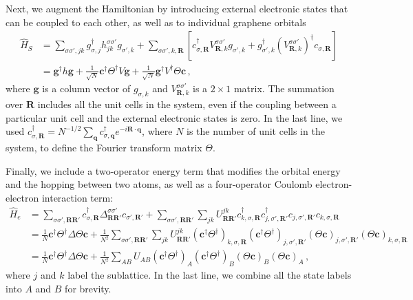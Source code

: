 \documentclass[aps, prb, superscriptaddress, preprint, floatfix]{revtex4-1}
\begin{document}
Next, we augment the Hamiltonian by introducing external electronic states that can be coupled to each other, as well as to individual graphene orbitals
%
\begin{align}
	\hat{H}_S 
	&=
	\sum_{\sigma\sigma', jk} g_{\sigma, j}^\dagger h^{\sigma\sigma'}_{jk} g_{ \sigma',k} + 
	\sum_{\sigma\sigma',k,\mathbf{R}}\left[c^\dagger_{\sigma,\mathbf{R}} V^{\sigma\sigma'}_{\mathbf{R},k}g_{\sigma',k} + g_{\sigma',k}^\dagger \left(V^{\sigma\sigma'}_{\mathbf{R},k}\right)^\dagger c_{\sigma,\mathbf{R}}\right]
	\nonumber
	\\
	&=
	\mathbf{g}^\dagger h\mathbf{g}
	 + 
	 \frac{1}{\sqrt{N}}\mathbf{c}^\dagger \Theta^\dagger V\mathbf{g} 
	 + 
	 \frac{1}{\sqrt{N}}\mathbf{g}^\dagger V^\dagger \Theta \mathbf{c}
	\,,
\end{align}
%
where $\mathbf{g}$ is a column vector of $g_{\sigma,k}$ and $V^{\sigma\sigma'}_{\mathbf{R},k}$ is a $2\times 1$ matrix. The summation over $\mathbf{R}$ includes all the unit cells in the system, even if the coupling between a particular unit cell and the external electronic states is zero. In the last line, we used $c^\dagger_{\sigma,\mathbf{R}} = N^{-1/2}\sum_\mathbf{q}c^\dagger_{\sigma,\mathbf{q}} e^{-i\mathbf{R}\cdot\mathbf{q}}$, where $N$ is the number of unit cells in the system, to define the Fourier transform matrix $\Theta$.

Finally, we include a two-operator energy term that modifies the orbital energy and the hopping between two atoms, as well as a four-operator Coulomb electron-electron interaction term:
%
\begin{align}
	\hat{H}_{e} &= 
	\sum_{\sigma\sigma',\mathbf{RR}'} c^\dagger_{\sigma,\mathbf{R}}\Delta_{\mathbf{RR}'}^{\sigma\sigma'}c_{\sigma',\mathbf{R}'}
	+
	\sum_{\sigma\sigma',\mathbf{RR}'}\sum_{jk}
	U_{\mathbf{RR}'}^{jk}
	c_{k,\sigma,\mathbf{R}}^\dagger
	c_{j,\sigma',\mathbf{R}'}^\dagger
	c_{j,\sigma',\mathbf{R}'}
	c_{k,\sigma,\mathbf{R}}
	\nonumber
	\\
	&= 
	\frac{1}{N}\mathbf{c}^\dagger \Theta^\dagger \Delta\Theta\mathbf{c}
	+
	\frac{1}{N^2}\sum_{\sigma\sigma',\mathbf{RR}'}\sum_{jk}
	U_{\mathbf{RR}'}^{jk}
	\left(\mathbf{c}^\dagger\Theta^\dagger \right)_{k,\sigma,\mathbf{R}}
	\left(\mathbf{c}^\dagger\Theta^\dagger \right)_{j,\sigma',\mathbf{R}'}
	\left(\Theta\mathbf{c}\right)_{j,\sigma',\mathbf{R}'}
	\left(\Theta\mathbf{c}\right)_{k,\sigma,\mathbf{R}}
	\nonumber
	\\
	&= 
	\frac{1}{N}\mathbf{c}^\dagger \Theta^\dagger \Delta\Theta\mathbf{c}
	+
	\frac{1}{N^2}\sum_{AB}
	U_{AB}	\left(\mathbf{c}^\dagger\Theta^\dagger \right)_{A}
	\left(\mathbf{c}^\dagger\Theta^\dagger \right)_{B}
	\left(\Theta\mathbf{c}\right)_{B}
	\left(\Theta\mathbf{c}\right)_{A}\,,
\end{align}
%
where $j$ and $k$ label the sublattice. In the last line, we combine all the state labels into $A$ and $B$ for brevity.
\end{document}
